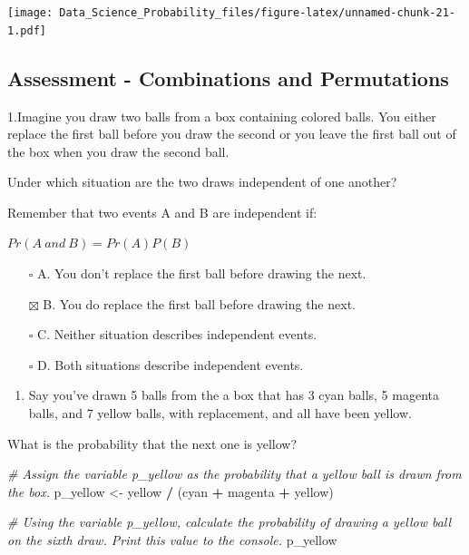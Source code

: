 \documentclass[
]{article}
\newenvironment{Shaded}{\begin{snugshade}}{\end{snugshade}}
\newcommand{\CommentTok}[1]{\textcolor[rgb]{0.56,0.35,0.01}{\textit{#1}}}
\newcommand{\NormalTok}[1]{#1}
\newcommand{\OperatorTok}[1]{\textcolor[rgb]{0.81,0.36,0.00}{\textbf{#1}}}
\newcommand{\StringTok}[1]{\textcolor[rgb]{0.31,0.60,0.02}{#1}}
\providecommand{\tightlist}{%
  \setlength{\itemsep}{0pt}\setlength{\parskip}{0pt}}
\begin{document}
\texttt{[image: Data\_Science\_Probability\_files/figure-latex/unnamed-chunk-21-1.pdf]}

\hypertarget{assessment---combinations-and-permutations}{%
\subsection{Assessment - Combinations and
Permutations}\label{assessment---combinations-and-permutations}}

1.Imagine you draw two balls from a box containing colored balls. You
either replace the first ball before you draw the second or you leave
the first ball out of the box when you draw the second ball.

Under which situation are the two draws independent of one another?

Remember that two events A and B are independent if:

\(Pr(A\:and\:B) = Pr(A)P(B)\)

\begin{itemize}
\tightlist
\item[$\square$]
  A. You don't replace the first ball before drawing the next.
\item[$\boxtimes$]
  B. You do replace the first ball before drawing the next.
\item[$\square$]
  C. Neither situation describes independent events.
\item[$\square$]
  D. Both situations describe independent events.
\end{itemize}

\begin{enumerate}
\def\labelenumi{\arabic{enumi}.}
\setcounter{enumi}{1}
\tightlist
\item
  Say you've drawn 5 balls from the a box that has 3 cyan balls, 5
  magenta balls, and 7 yellow balls, with replacement, and all have been
  yellow.
\end{enumerate}

What is the probability that the next one is yellow?

\begin{Shaded}
\begin{Highlighting}[]
\CommentTok{\# Assign the variable \textquotesingle{}p\_yellow\textquotesingle{} as the probability that a yellow ball is drawn from the box.}
\NormalTok{p\_yellow \textless{}{-}}\StringTok{ }\NormalTok{yellow }\OperatorTok{/}\StringTok{ }\NormalTok{(cyan }\OperatorTok{+}\StringTok{ }\NormalTok{magenta }\OperatorTok{+}\StringTok{ }\NormalTok{yellow)}

\CommentTok{\# Using the variable \textquotesingle{}p\_yellow\textquotesingle{}, calculate the probability of drawing a yellow ball on the sixth draw. Print this value to the console.}
\NormalTok{p\_yellow}
\end{Highlighting}
\end{Shaded}
\end{document}

